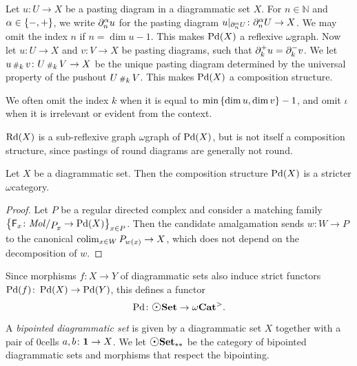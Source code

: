 \begin{dfn} 
    Let \( u \colon U \to X \) be a pasting diagram in a diagrammatic set \( X \).
    For \( n \in \mathbb{N} \) and \( \alpha \in \left\{ {-, +} \right\} \), we write \( \partial_{n}^{\alpha} u \) for the pasting diagram \( \restr{u}{\bd{n}{\a}U} \colon \bd{n}{\a} U \to X \).
    We may omit the index \( n \) if \( n = \dim u - 1 \).
    This makes \( \operatorname{Pd}(X) \) a reflexive \( \omega \)\nbd graph.
    Now let \( u \colon U \to X \) and \( v \colon V \to X \) be pasting diagrams, such that \( \partial_{k}^{+} u = \partial_{k}^{-} v \).
    We let \( u \,{\scriptstyle\#}_{k}\, v \colon U \,{\scriptstyle\#}_{k}\, V \to X \) be the unique pasting diagram determined by the universal property of the pushout \( U \,{\scriptstyle\#}_{k}\, V \).
    This makes \( \operatorname{Pd}(X) \) a composition structure.
\end{dfn}
\noindent We often omit the index \( k \) when it is equal to \( \min \left\{ {\dim u, \dim v} \right\} - 1 \), and omit \( \iota \) when it is irrelevant or evident from the context.

\begin{rmk}
    \( \operatorname{Rd}(X) \) is a sub-reflexive graph \( \omega \)\nbd graph of \( \operatorname{Pd}(X) \), but is not itself a composition structure, since pastings of round diagrams are generally not round. 
\end{rmk}

\begin{lem} \label{lem:Pd_is_stricter}
    Let \( X \) be a diagrammatic set.
    Then the composition structure \( \operatorname{Pd}(X) \) is a stricter \( \omega \)\nbd category.
\end{lem}
\begin{proof}
    Let \( P \) be a regular directed complex and consider a matching family \( \set{\F_x \colon \molecin{\imel{P}{x}} \to \Pd(X)}_{x \in P} \).
    Then the candidate amalgamation sends \( w \colon W \to P \) to the canonical \( \operatorname*{colim}_{x \in W} {P}_{w(x)} \to X \), which does not depend on the decomposition of \( w \).
\end{proof}

\noindent Since morphisms \( f \colon X \to Y \) of diagrammatic sets also induce strict functors \( \operatorname{Pd}(f) \colon \operatorname{Pd}(X) \to \operatorname{Pd}(Y) \), this defines a functor
\begin{equation*}
    \Pd \colon \dgmSet \to \somegaCat.
\end{equation*}

\begin{dfn} 
    A \emph{bipointed diagrammatic set} is given by a diagrammatic set \( X \) together with a pair of \( 0 \)\nbd cells \( a, b \colon \mathbf{1} \to X \).
    We let \( \bpt\dgmSet \) be the category of bipointed diagrammatic sets and morphisms that respect the bipointing.
\end{dfn}

